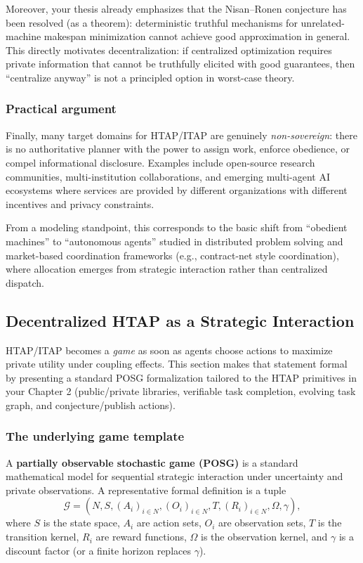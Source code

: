 Moreover, your thesis already emphasizes that the Nisan--Ronen conjecture has been resolved (as a theorem): deterministic truthful mechanisms for unrelated-machine makespan minimization cannot achieve good approximation in general. This directly motivates decentralization: if centralized optimization requires private information that cannot be truthfully elicited with good guarantees, then ``centralize anyway'' is not a principled option in worst-case theory.

\subsubsection{Practical argument}

Finally, many target domains for HTAP/ITAP are genuinely \emph{non-sovereign}: there is no authoritative planner with the power to assign work, enforce obedience, or compel informational disclosure. Examples include open-source research communities, multi-institution collaborations, and emerging multi-agent AI ecosystems where services are provided by different organizations with different incentives and privacy constraints.

From a modeling standpoint, this corresponds to the basic shift from ``obedient machines'' to ``autonomous agents'' studied in distributed problem solving and market-based coordination frameworks (e.g., contract-net style coordination), where allocation emerges from strategic interaction rather than centralized dispatch.

\subsection{Decentralized HTAP as a Strategic Interaction}

HTAP/ITAP becomes a \emph{game} as soon as agents choose actions to maximize private utility under coupling effects. This section makes that statement formal by presenting a standard POSG formalization tailored to the HTAP primitives in your Chapter 2 (public/private libraries, verifiable task completion, evolving task graph, and conjecture/publish actions).

\subsubsection{The underlying game template}

A \textbf{partially observable stochastic game (POSG)} is a standard mathematical model for sequential strategic interaction under uncertainty and private observations. A representative formal definition is a tuple
\[
\mathcal{G} = (N, S, (A_i)_{i\in N}, (O_i)_{i\in N}, T, (R_i)_{i\in N}, \Omega, \gamma),
\]
where \(S\) is the state space, \(A_i\) are action sets, \(O_i\) are observation sets, \(T\) is the transition kernel, \(R_i\) are reward functions, \(\Omega\) is the observation kernel, and \(\gamma\) is a discount factor (or a finite horizon replaces \(\gamma\)).

